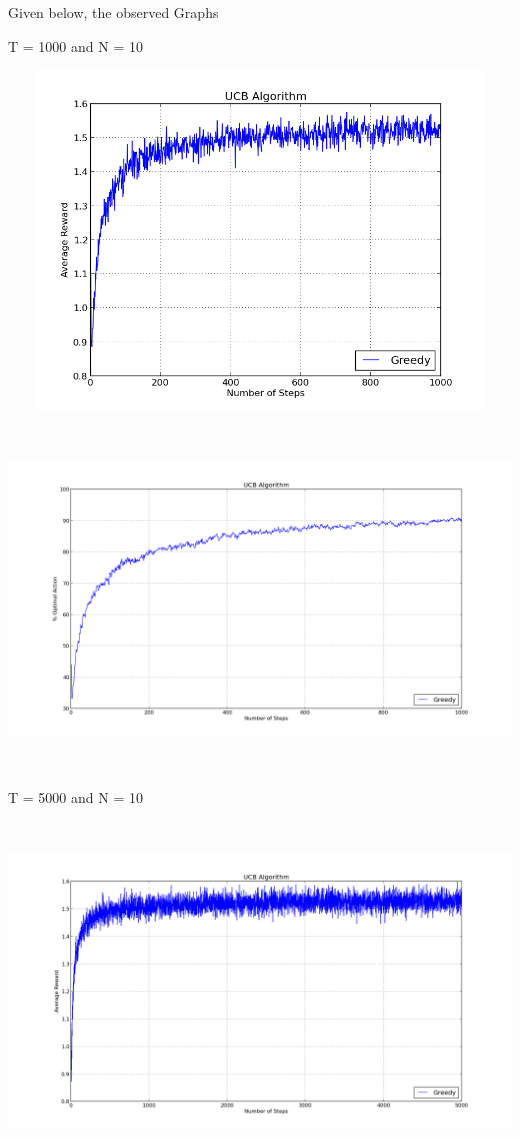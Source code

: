 \documentclass[a4paper,10pt]{report}
\newenvironment{my_itemize}{
\begin{itemize}
  \setlength{\itemsep}{1pt}
  \setlength{\parskip}{0pt}
  \setlength{\parsep}{0pt}}{
\end{itemize}}
\begin{document}
\pagebreak
Given below, the observed Graphs
\begin{my_itemize}
\item T = 1000 and N = 10
\begin{center}
\centerline{\includegraphics*[width=180mm, height=90mm]{UCBRew-10-1000.png}}
\end{center}
\begin{center}
\centerline{\includegraphics*[width=180mm, height=90mm]{UCBOpt-10-1000.png}}
\end{center}
\pagebreak
\item T = 5000 and N = 10
\begin{center}
\centerline{\includegraphics*[width=180mm, height=90mm]{UCBRew-10-5000.png}}

\end{center}
\end{my_itemize}
\end{document}
